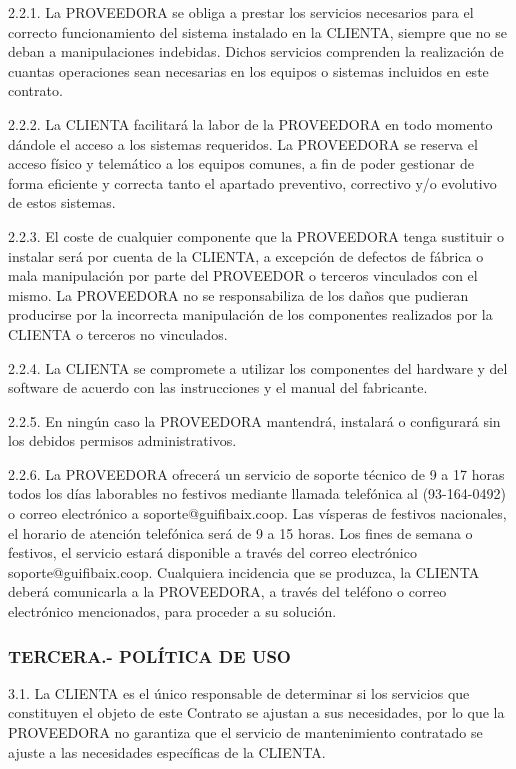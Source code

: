 \documentclass[11pt,spanish,a4paper,]{article}
\begin{document}
2.2.1. La PROVEEDORA se obliga a prestar los servicios necesarios para
el correcto funcionamiento del sistema instalado en la CLIENTA, siempre
que no se deban a manipulaciones indebidas. Dichos servicios comprenden
la realización de cuantas operaciones sean necesarias en los equipos o
sistemas incluidos en este contrato.

2.2.2. La CLIENTA facilitará la labor de la PROVEEDORA en todo momento
dándole el acceso a los sistemas requeridos. La PROVEEDORA se reserva el
acceso físico y telemático a los equipos comunes, a fin de poder
gestionar de forma eficiente y correcta tanto el apartado preventivo,
correctivo y/o evolutivo de estos sistemas.

2.2.3. El coste de cualquier componente que la PROVEEDORA tenga
sustituir o instalar será por cuenta de la CLIENTA, a excepción de
defectos de fábrica o mala manipulación por parte del PROVEEDOR o
terceros vinculados con el mismo. La PROVEEDORA no se responsabiliza de
los daños que pudieran producirse por la incorrecta manipulación de los
componentes realizados por la CLIENTA o terceros no vinculados.

2.2.4. La CLIENTA se compromete a utilizar los componentes del hardware
y del software de acuerdo con las instrucciones y el manual del
fabricante.

2.2.5. En ningún caso la PROVEEDORA mantendrá, instalará o configurará
sin los debidos permisos administrativos.

2.2.6. La PROVEEDORA ofrecerá un servicio de soporte técnico de 9 a 17
horas todos los días laborables no festivos mediante llamada telefónica
al (93-164-0492) o correo electrónico a soporte@guifibaix.coop. Las
vísperas de festivos nacionales, el horario de atención telefónica será
de 9 a 15 horas. Los fines de semana o festivos, el servicio estará
disponible a través del correo electrónico soporte@guifibaix.coop.
Cualquiera incidencia que se produzca, la CLIENTA deberá comunicarla a
la PROVEEDORA, a través del teléfono o correo electrónico mencionados,
para proceder a su solución.

\subsubsection{TERCERA.- POLÍTICA DE
USO}\label{tercera.--poluxedtica-de-uso}

3.1. La CLIENTA es el único responsable de determinar si los servicios
que constituyen el objeto de este Contrato se ajustan a sus necesidades,
por lo que la PROVEEDORA no garantiza que el servicio de mantenimiento
contratado se ajuste a las necesidades específicas de la CLIENTA.
\end{document}
